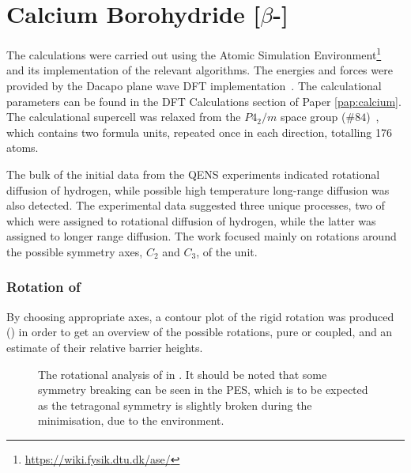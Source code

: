 \section{Calcium Borohydride [$\beta$-]}
\label{sec:borohydrides-calcium}
The calculations were carried out using the Atomic Simulation Environment\footnote{\url{https://wiki.fysik.dtu.dk/ase/}}~\cite{ase-2002} and its implementation of the relevant algorithms.
The energies and forces were provided by the Dacapo plane wave DFT implementation~\cite{dacapo-1999}.
The calculational parameters can be found in the DFT Calculations section of Paper \ref{pap:calcium}.
The calculational supercell was relaxed from the $P4_2/m$ space group ($\#84$)~\cite{cabh42-structure-p42m}, which contains two formula units, repeated once in each direction, totalling 176 atoms.

The bulk of the initial data from the QENS experiments indicated rotational diffusion of hydrogen, while possible high temperature long-range diffusion was also detected.
The experimental data suggested three unique processes, two of which were assigned to rotational diffusion of hydrogen, while the latter was assigned to longer range diffusion.
The work focused mainly on rotations around the possible symmetry axes, $C_2$ and $C_3$, of the  unit.

\subsubsection{Rotation of }
By choosing appropriate axes, a contour plot of the rigid rotation was produced () in order to get an overview of the possible rotations, pure or coupled, and an estimate of their relative barrier heights.

\begin{figure}[hp]
\begin{center}
    \parbox{0.85\linewidth}{
      \caption{The rotational analysis of  in .
It should be noted that some symmetry breaking can be seen in the PES, which is to be expected as the tetragonal symmetry is slightly broken during the minimisation, due to the environment.
      }
      \label{fig:ca-rotational}
    }
\end{center}
\end{figure}

